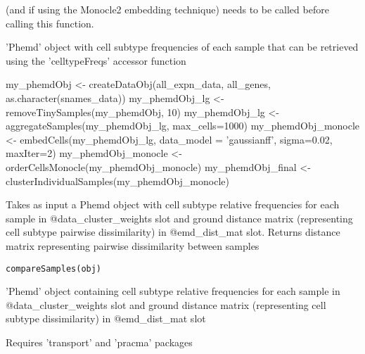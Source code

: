 \documentclass[a4paper]{book}
\begin{document}
%
\begin{Details}\relax
{} (and  if using the Monocle2 embedding technique) needs to be called before calling this function.
\end{Details}
%
\begin{Value}
'Phemd' object with cell subtype frequencies of each sample that can be retrieved using the 'celltypeFreqs' accessor function
\end{Value}
%
\begin{Examples}
\begin{ExampleCode}

my_phemdObj <- createDataObj(all_expn_data, all_genes, as.character(snames_data))
my_phemdObj_lg <- removeTinySamples(my_phemdObj, 10)
my_phemdObj_lg <- aggregateSamples(my_phemdObj_lg, max_cells=1000)
my_phemdObj_monocle <- embedCells(my_phemdObj_lg, data_model = 'gaussianff', sigma=0.02, maxIter=2)
my_phemdObj_monocle <- orderCellsMonocle(my_phemdObj_monocle)
my_phemdObj_final <- clusterIndividualSamples(my_phemdObj_monocle)

\end{ExampleCode}
\end{Examples}
%
\begin{Description}\relax
Takes as input a Phemd object with cell subtype relative frequencies for each sample in @data\_cluster\_weights slot and ground distance matrix (representing cell subtype pairwise dissimilarity) in @emd\_dist\_mat slot. Returns distance matrix representing pairwise dissimilarity between samples
\end{Description}
%
\begin{Usage}
\begin{verbatim}
compareSamples(obj)
\end{verbatim}
\end{Usage}
%
\begin{Arguments}
\begin{ldescription}
\item[\code{obj}] 'Phemd' object containing cell subtype relative frequencies for each sample in @data\_cluster\_weights slot and ground distance matrix (representing cell subtype dissimilarity) in @emd\_dist\_mat slot
\end{ldescription}
\end{Arguments}
%
\begin{Details}\relax
Requires 'transport' and 'pracma' packages
\end{Details}
\end{document}

